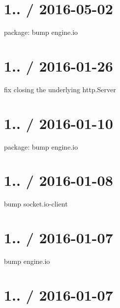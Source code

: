 \section*{1.. / 2016-\/05-\/02 }


\begin{DoxyItemize}
\item package\+: bump engine.\+io
\end{DoxyItemize}

\section*{1.. / 2016-\/01-\/26 }


\begin{DoxyItemize}
\item fix closing the underlying {\ttfamily http.\+Server}
\end{DoxyItemize}

\section*{1.. / 2016-\/01-\/10 }


\begin{DoxyItemize}
\item package\+: bump {\ttfamily engine.\+io}
\end{DoxyItemize}

\section*{1.. / 2016-\/01-\/08 }


\begin{DoxyItemize}
\item bump {\ttfamily socket.\+io-\/client}
\end{DoxyItemize}

\section*{1.. / 2016-\/01-\/07 }


\begin{DoxyItemize}
\item bump {\ttfamily engine.\+io}
\end{DoxyItemize}

\section*{1.. / 2016-\/01-\/07 }


